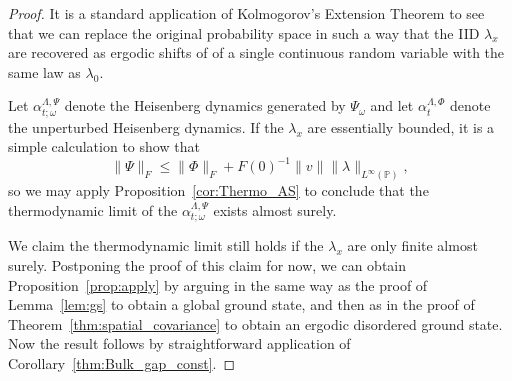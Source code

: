 \documentclass{article}
\renewcommand{\P}{\mathbb{P}}
\newcommand{\<}{\langle}
\renewcommand{\>}{\rangle}
\theoremstyle{definition}
\numberwithin{equation}{section}
\begin{document}
\begin{proof}


It is a standard application of Kolmogorov's Extension Theorem to see that we can replace the original probability space in such a way that  the IID $\lambda_x$ are recovered as ergodic shifts of of a single continuous random variable with the same law as $\lambda_0$. 

   Let $\alpha^{\Lambda,\Psi}_{t;\omega}$ denote the Heisenberg dynamics generated by $\Psi_\omega$ and let $\alpha^{\Lambda, \Phi}_{t}$ denote the unperturbed Heisenberg dynamics. If the $\lambda_x$ are essentially bounded, it is a simple calculation to show that 
    \[
        \|\Psi\|_F \le \|\Phi\|_F + F(0)^{-1}\|v\| \|\lambda\|_{L^\infty(\P)},
    \] so we may apply Proposition~\ref{cor:Thermo_AS} to conclude that the thermodynamic limit of the $\alpha^{\Lambda, \Psi}_{t;\omega}$ exists almost surely. 
    
    We claim the thermodynamic limit still holds if the $\lambda_x$ are only finite almost surely. Postponing the proof of this claim for now, we can obtain Proposition~\ref{prop:apply} by arguing in the same way as the proof of Lemma~\ref{lem:gs} to obtain a global ground state, and then as in the proof of Theorem~\ref{thm:spatial_covariance} to obtain an ergodic disordered ground state. Now the result follows by straightforward application of Corollary~\ref{thm:Bulk_gap_const}. 
    

\end{proof}
\end{document}
